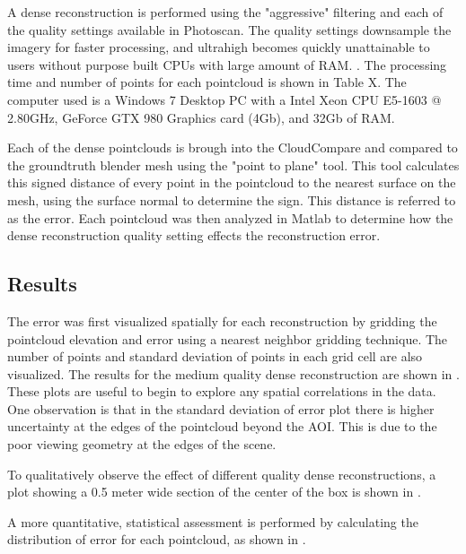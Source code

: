 A dense reconstruction is performed using the "aggressive" filtering and each of the quality settings available in Photoscan.  The quality settings downsample the imagery for faster processing, and ultrahigh becomes quickly unattainable to users without purpose built CPUs with large amount of RAM. . The processing time and number of points for each pointcloud is shown in Table X.  The computer used is a Windows 7 Desktop PC with a Intel Xeon CPU E5-1603 @ 2.80GHz, GeForce GTX 980 Graphics card (4Gb), and 32Gb of RAM.



Each of the dense pointclouds is brough into the CloudCompare  and compared to the groundtruth blender mesh using the "point to plane" tool.  This tool calculates this signed distance of every point in the pointcloud to the nearest surface on the mesh, using the surface normal to determine the sign.  This distance is referred to as the error.  Each pointcloud was then analyzed in Matlab to determine how the dense reconstruction quality setting effects the reconstruction error.

\subsection{Results}

The error was first visualized spatially for each reconstruction by gridding the pointcloud elevation and error using a nearest neighbor gridding technique.  The number of points and standard deviation of points in each grid cell are also visualized.  The results for the medium quality dense reconstruction are shown in .  These plots are useful to begin to explore any spatial correlations in the data.  One observation is that in the standard deviation of error plot there is higher uncertainty at the edges of the pointcloud beyond the AOI.  This is due to the poor viewing geometry at the edges of the scene.  



To qualitatively observe the effect of different quality dense reconstructions, a plot showing a 0.5 meter wide section of the center of the box is shown in .  



A more quantitative, statistical assessment is performed by calculating the distribution of error for each pointcloud, as shown in . 





	
